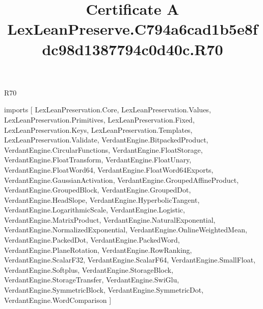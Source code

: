 \begin{lexlean}{R70}
\title{Certificate A LexLeanPreserve.C794a6cad1b5e8fdc98d1387794c0d40c.R70}
\begin{coremodule}
imports [
  LexLeanPreservation.Core,
  LexLeanPreservation.Values,
  LexLeanPreservation.Primitives,
  LexLeanPreservation.Fixed,
  LexLeanPreservation.Keys,
  LexLeanPreservation.Templates,
  LexLeanPreservation.Validate,
  VerdantEngine.BitpackedProduct,
  VerdantEngine.CircularFunctions,
  VerdantEngine.FloatStorage,
  VerdantEngine.FloatTransform,
  VerdantEngine.FloatUnary,
  VerdantEngine.FloatWord64,
  VerdantEngine.FloatWord64Exports,
  VerdantEngine.GaussianActivation,
  VerdantEngine.GroupedAffineProduct,
  VerdantEngine.GroupedBlock,
  VerdantEngine.GroupedDot,
  VerdantEngine.HeadSlope,
  VerdantEngine.HyperbolicTangent,
  VerdantEngine.LogarithmicScale,
  VerdantEngine.Logistic,
  VerdantEngine.MatrixProduct,
  VerdantEngine.NaturalExponential,
  VerdantEngine.NormalizedExponential,
  VerdantEngine.OnlineWeightedMean,
  VerdantEngine.PackedDot,
  VerdantEngine.PackedWord,
  VerdantEngine.PlaneRotation,
  VerdantEngine.RowRanking,
  VerdantEngine.ScalarF32,
  VerdantEngine.ScalarF64,
  VerdantEngine.SmallFloat,
  VerdantEngine.Softplus,
  VerdantEngine.StorageBlock,
  VerdantEngine.StorageTransfer,
  VerdantEngine.SwiGlu,
  VerdantEngine.SymmetricBlock,
  VerdantEngine.SymmetricDot,
  VerdantEngine.WordComparison
]


\end{coremodule}
\end{lexlean}
